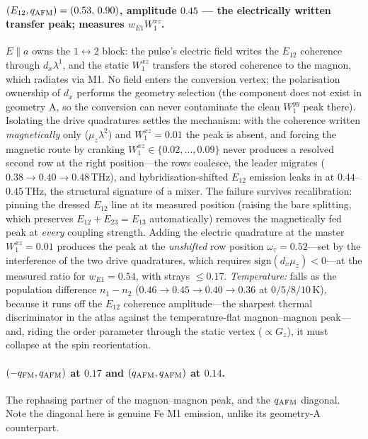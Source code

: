 \documentclass[11pt]{article}
\newcommand{\qafm}{q_{\rm AFM}}
\newcommand{\qfm}{q_{\rm FM}}
\begin{document}
\paragraph{$(E_{12},\qafm)=(0.53,\,0.90)$, amplitude $0.45$ --- the
electrically written transfer peak; measures $w_{E1}W^{xz}_1$.}
$E\!\parallel\!a$ owns the $1\!\leftrightarrow\!2$ block: the pulse's
electric field writes the $E_{12}$ coherence through $d_x\lambda^1$,
and the static $W^{xz}_1$ transfers the stored coherence to the magnon,
which radiates via M1.  No field enters the conversion vertex; the
polarisation ownership of $d_x$ performs the geometry selection (the
component does not exist in geometry A, so the conversion can never
contaminate the clean $W^{yy}_1$ peak there).  Isolating the drive
quadratures settles the mechanism: with the coherence written
\emph{magnetically} only ($\mu_z\lambda^2$) and $W^{xz}_1=0.01$ the
peak is absent, and forcing the magnetic route by cranking
$W^{xz}_1\in\{0.02,\dots,0.09\}$ never produces a resolved second row
at the right position---the rows coalesce, the leader migrates
($0.38\to0.40\to0.48$\,THz), and hybridisation-shifted $E_{12}$
emission leaks in at $0.44$--$0.45$\,THz, the structural signature of
a mixer.  The failure survives recalibration: pinning the dressed
$E_{12}$ line at its measured position (raising the bare splitting,
which preserves $E_{12}{+}E_{23}{=}E_{13}$ automatically) removes the
magnetically fed peak at \emph{every} coupling strength.  Adding the
electric quadrature at the master $W^{xz}_1=0.01$ produces the peak at
the \emph{unshifted} row position $\omega_\tau=0.52$---set by the
interference of the two drive quadratures, which requires
$\mathrm{sign}(d_x\mu_z)<0$---at the measured ratio for
$w_{E1}=0.54$, with strays $\leq0.17$.  \emph{Temperature:} falls as
the population difference $n_1-n_2$
($0.46\to0.45\to0.40\to0.36$ at $0/5/8/10$\,K), because it runs off the
$E_{12}$ coherence amplitude---the sharpest thermal discriminator in
the atlas against the temperature-flat magnon--magnon peak---and,
riding the order parameter through the static vertex ($\propto G_z$),
it must collapse at the spin reorientation.

\paragraph{$(-\qfm,\qafm)$ at $0.17$ and $(\qafm,\qafm)$ at $0.14$.}
The rephasing partner of the magnon--magnon peak, and the $\qafm$
diagonal.  Note the diagonal here is genuine Fe M1 emission, unlike its
geometry-A counterpart.
\end{document}
